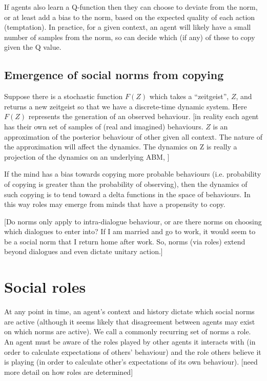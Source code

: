\documentclass[a4paper]{article}
\begin{document}
If agents also learn a Q-function then they can choose to deviate from the norm, or at least add a bias to the norm, based on the expected quality of each action (temptation). In practice, for a given context, an agent will likely have a small number of samples from the norm, so can decide which (if any) of these to copy given the Q value.

\subsection{Emergence of social norms from copying}

Suppose there is a stochastic function $F(Z)$ which takes a ``zeitgeist'', $Z$, and returns a new zeitgeist so that we have a discrete-time dynamic system. Here $F(Z)$ represents the generation of an observed behaviour.  [in reality each agent has their own set of samples of (real and imagined) behaviours. $Z$ is an approximation of the posterior behaviour of other given all context. The nature of the approximation will affect the dynamics. The dynamics on Z is really a projection of the dynamics on an underlying ABM, ]

If the mind has a bias towards copying more probable behaviours (i.e. probability of copying is greater than the probability of observing), then the dynamics of such copying is to tend toward a delta functions in the space of behaviours. In this way roles may emerge from minds that have a propensity to copy.

[Do norms only apply to intra-dialogue behaviour, or are there norms on choosing which dialogues to enter into? If I am married and go to work, it would seem to be a social norm that I return home after work. So, norms (via roles) extend beyond dialogues and even dictate unitary action.]

\section{Social roles}

At any point in time, an agent's context and history dictate which social norms are active (although it seems likely that disagreement between agents may exist on which norms are active). We call a commonly recurring set of norms a role. An agent must be aware of the roles played by other agents it interacts with (in order to calculate expectations of others' behaviour) and the role others believe it is playing (in order to calculate other's expectations of its own behaviour). [need more detail on how roles are determined]
\end{document}
